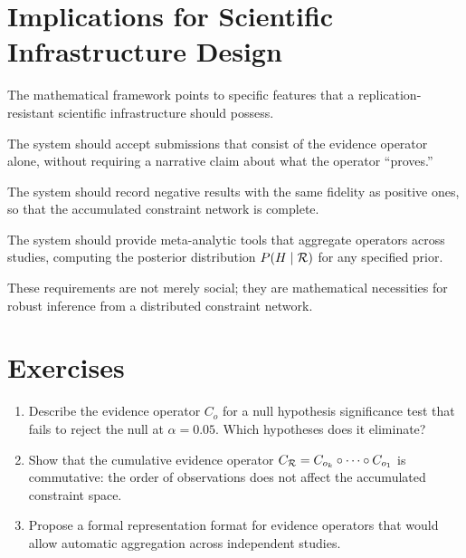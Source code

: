 \section{Implications for Scientific Infrastructure Design}

The mathematical framework points to specific features that a replication-resistant scientific infrastructure should possess.

The system should accept submissions that consist of the evidence operator alone, without requiring a narrative claim about what the operator ``proves.''

The system should record negative results with the same fidelity as positive ones, so that the accumulated constraint network is complete.

The system should provide meta-analytic tools that aggregate operators across studies, computing the posterior distribution $P(H \mid \mathcal{R})$ for any specified prior.

These requirements are not merely social; they are mathematical necessities for robust inference from a distributed constraint network.

\section{Exercises}

\begin{enumerate}
  \item Describe the evidence operator $C_o$ for a null hypothesis significance test that fails to reject the null at $\alpha = 0.05$. Which hypotheses does it eliminate?
  \item Show that the cumulative evidence operator $C_{\mathcal{R}} = C_{o_k} \circ \cdots \circ C_{o_1}$ is commutative: the order of observations does not affect the accumulated constraint space.
  \item Propose a formal representation format for evidence operators that would allow automatic aggregation across independent studies.
\end{enumerate}
